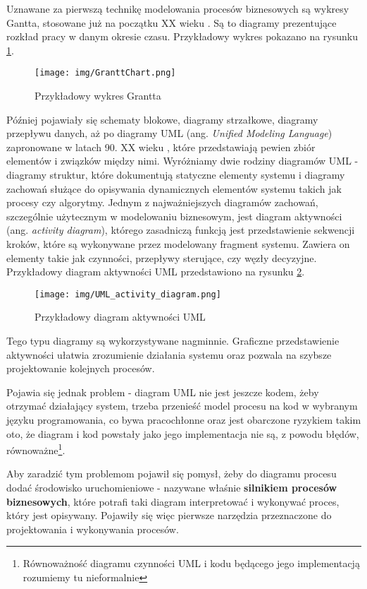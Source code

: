 \documentclass[declaration,shortabstract,mgr]{iithesis}
\begin{document}
Uznawane za pierwszą technikę modelowania procesów biznesowych są wykresy Gantta, stosowane już na początku XX wieku \cite{bpm-history-wiki}. Są to diagramy prezentujące rozkład pracy w danym okresie czasu. Przykładowy wykres pokazano na rysunku \ref{fig:grantt-chart}.

\begin{figure}[H]
    \texttt{[image: img/GranttChart.png]}
    \caption{Przykładowy wykres Grantta}
    \label{fig:grantt-chart}
\end{figure}

Później pojawiały się schematy blokowe, diagramy strzałkowe, diagramy przepływu danych, aż po diagramy UML (ang. \textit{Unified Modeling Language}) zapronowane w latach 90. XX wieku \cite{uml-wiki}, które przedstawiają pewien zbiór elementów i związków między nimi. Wyróżniamy dwie rodziny diagramów UML - diagramy struktur, które dokumentują statyczne elementy systemu i diagramy zachowań służące do opisywania dynamicznych elementów systemu takich jak procesy czy algorytmy. Jednym z najważniejszych diagramów zachowań, szczególnie użytecznym w modelowaniu biznesowym, jest diagram aktywności (ang. \textit{activity diagram}), którego zasadniczą funkcją jest przedstawienie sekwencji kroków, które są wykonywane przez modelowany fragment systemu. Zawiera on elementy takie jak czynności, przepływy sterujące, czy węzły decyzyjne. Przykładowy diagram aktywności UML przedstawiono na rysunku \ref{fig:uml-activity-diagram}.

\begin{figure}[H]
    \texttt{[image: img/UML\_activity\_diagram.png]}
    \caption{Przykładowy diagram aktywności UML}
    \label{fig:uml-activity-diagram}
\end{figure}

Tego typu diagramy są wykorzystywane nagminnie. Graficzne przedstawienie aktywności ułatwia zrozumienie działania systemu oraz pozwala na szybsze projektowanie kolejnych procesów. 

Pojawia się jednak problem - diagram UML nie jest jeszcze kodem,
żeby otrzymać działający system, trzeba przenieść model procesu na kod w wybranym języku programowania, co bywa pracochłonne oraz 
jest obarczone ryzykiem takim oto, że diagram i kod powstały jako
jego implementacja nie są, z powodu błędów, równoważne\footnote{Równoważność diagramu czynności UML i kodu będącego jego implementacją
rozumiemy tu nieformalnie}.

Aby zaradzić tym problemom pojawił się pomysł, żeby do diagramu procesu dodać środowisko uruchomieniowe - nazywane właśnie 
{\bf silnikiem procesów biznesowych}, które potrafi taki diagram interpretować i wykonywać proces, który jest opisywany. Pojawiły się więc pierwsze narzędzia przeznaczone do projektowania i wykonywania procesów.
\end{document}
